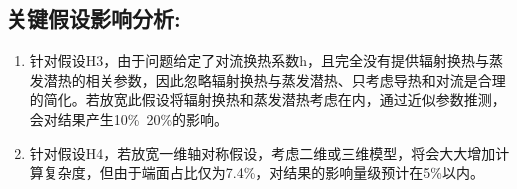\documentclass[12pt,a4paper]{article}
\newcommand{\prompt}[1]{\par\noindent\textbf{【写作提示】}#1\par}      %
\newcommand{\ph}[1]{\textbf{【#1】}}                                   %
\newcommand{\handbook}[2]{\par\noindent\textbf{【手册索引：#1】} #2\par}
\begin{document}
\subsection*{关键假设影响分析:}

\begin{enumerate}
       \item 针对假设H3，由于问题给定了对流换热系数h，且完全没有提供辐射换热与蒸发潜热的相关参数，因此忽略辐射换热与蒸发潜热、只考虑导热和对流是合理的简化。若放宽此假设将辐射换热和蒸发潜热考虑在内，通过近似参数推测，会对结果产生10\%~20\%的影响。
       \item 针对假设H4，若放宽一维轴对称假设，考虑二维或三维模型，将会大大增加计算复杂度，但由于端面占比仅为7.4\%，对结果的影响量级预计在5\%以内。
\end{enumerate}




\end{document}
